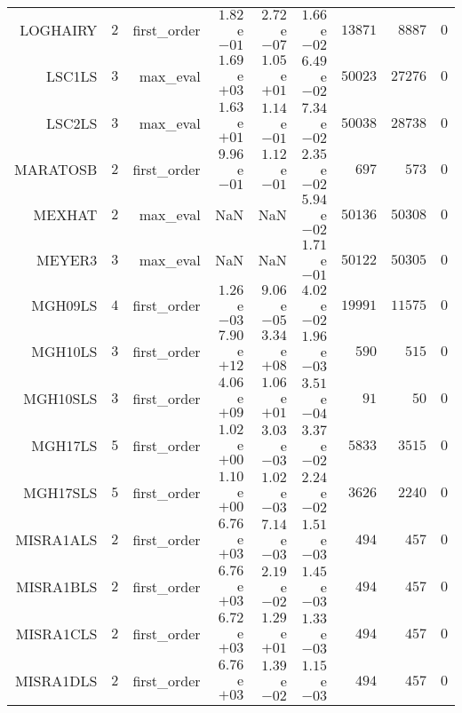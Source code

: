 \begin{longtable}{rrrrrrrrr}
LOGHAIRY & \(     2\) & first\_order & \( 1.82\)e\(-01\) & \( 2.72\)e\(-07\) & \( 1.66\)e\(-02\) & \( 13871\) & \(  8887\) & \(     0\) \\
LSC1LS & \(     3\) & max\_eval & \( 1.69\)e\(+03\) & \( 1.05\)e\(+01\) & \( 6.49\)e\(-02\) & \( 50023\) & \( 27276\) & \(     0\) \\
LSC2LS & \(     3\) & max\_eval & \( 1.63\)e\(+01\) & \( 1.14\)e\(-01\) & \( 7.34\)e\(-02\) & \( 50038\) & \( 28738\) & \(     0\) \\
MARATOSB & \(     2\) & first\_order & \( 9.96\)e\(-01\) & \( 1.12\)e\(-01\) & \( 2.35\)e\(-02\) & \(   697\) & \(   573\) & \(     0\) \\
MEXHAT & \(     2\) & max\_eval &       NaN &       NaN & \( 5.94\)e\(-02\) & \( 50136\) & \( 50308\) & \(     0\) \\
MEYER3 & \(     3\) & max\_eval &       NaN &       NaN & \( 1.71\)e\(-01\) & \( 50122\) & \( 50305\) & \(     0\) \\
MGH09LS & \(     4\) & first\_order & \( 1.26\)e\(-03\) & \( 9.06\)e\(-05\) & \( 4.02\)e\(-02\) & \( 19991\) & \( 11575\) & \(     0\) \\
MGH10LS & \(     3\) & first\_order & \( 7.90\)e\(+12\) & \( 3.34\)e\(+08\) & \( 1.96\)e\(-03\) & \(   590\) & \(   515\) & \(     0\) \\
MGH10SLS & \(     3\) & first\_order & \( 4.06\)e\(+09\) & \( 1.06\)e\(+01\) & \( 3.51\)e\(-04\) & \(    91\) & \(    50\) & \(     0\) \\
MGH17LS & \(     5\) & first\_order & \( 1.02\)e\(+00\) & \( 3.03\)e\(-03\) & \( 3.37\)e\(-02\) & \(  5833\) & \(  3515\) & \(     0\) \\
MGH17SLS & \(     5\) & first\_order & \( 1.10\)e\(+00\) & \( 1.02\)e\(-03\) & \( 2.24\)e\(-02\) & \(  3626\) & \(  2240\) & \(     0\) \\
MISRA1ALS & \(     2\) & first\_order & \( 6.76\)e\(+03\) & \( 7.14\)e\(-03\) & \( 1.51\)e\(-03\) & \(   494\) & \(   457\) & \(     0\) \\
MISRA1BLS & \(     2\) & first\_order & \( 6.76\)e\(+03\) & \( 2.19\)e\(-02\) & \( 1.45\)e\(-03\) & \(   494\) & \(   457\) & \(     0\) \\
MISRA1CLS & \(     2\) & first\_order & \( 6.72\)e\(+03\) & \( 1.29\)e\(+01\) & \( 1.33\)e\(-03\) & \(   494\) & \(   457\) & \(     0\) \\
MISRA1DLS & \(     2\) & first\_order & \( 6.76\)e\(+03\) & \( 1.39\)e\(-02\) & \( 1.15\)e\(-03\) & \(   494\) & \(   457\) & \(     0\) \\

\end{longtable}
